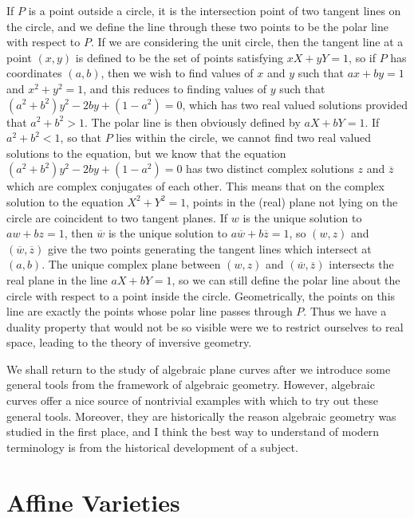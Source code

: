 \begin{example}
    If $P$ is a point outside a circle, it is the intersection point of two tangent lines on the circle, and we define the line through these two points to be the polar line with respect to $P$. If we are considering the unit circle, then the tangent line at a point $(x,y)$ is defined to be the set of points satisfying $xX + yY = 1$, so if $P$ has coordinates $(a,b)$, then we wish to find values of $x$ and $y$ such that $ax + by = 1$ and $x^2 + y^2 = 1$, and this reduces to finding values of $y$ such that $(a^2 + b^2)y^2 - 2by + (1 - a^2) = 0$, which has two real valued solutions provided that $a^2 + b^2 > 1$. The polar line is then obviously defined by $aX + bY = 1$. If $a^2 + b^2 < 1$, so that $P$ lies within the circle, we cannot find two real valued solutions to the equation, but we know that the equation $(a^2 + b^2)y^2 - 2by + (1 - a^2) = 0$ has two distinct complex solutions $z$ and $\overline{z}$ which are complex conjugates of each other. This means that on the complex solution to the equation $X^2 + Y^2 = 1$, points in the (real) plane not lying on the circle are coincident to two tangent planes. If $w$ is the unique solution to $aw + bz = 1$, then $\overline{w}$ is the unique solution to $a\overline{w} + b\overline{z} = 1$, so $(w,z)$ and $(\overline{w}, \overline{z})$ give the two points generating the tangent lines which intersect at $(a,b)$. The unique complex plane between $(w,z)$ and $(\overline{w}, \overline{z})$ intersects the real plane in the line $aX + bY = 1$, so we can still define the polar line about the circle with respect to a point inside the circle. Geometrically, the points on this line are exactly the points whose polar line passes through $P$. Thus we have a duality property that would not be so visible were we to restrict ourselves to real space, leading to the theory of inversive geometry.
\end{example}

We shall return to the study of algebraic plane curves after we introduce some general tools from the framework of algebraic geometry. However, algebraic curves offer a nice source of nontrivial examples with which to try out these general tools. Moreover, they are historically the reason algebraic geometry was studied in the first place, and I think the best way to understand of modern terminology is from the historical development of a subject.

\section{Affine Varieties}

